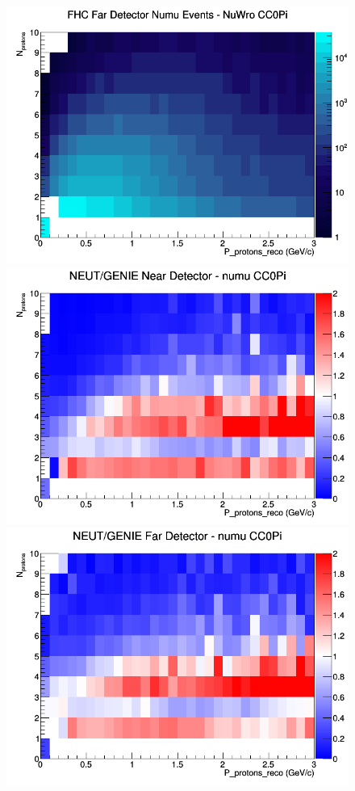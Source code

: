 \begin{figure}[h]
\endminipage
{}
\includegraphics[width=\linewidth]{eff_N_P/GAr/protons/CC0Pi_FHC_FD_numu_N_P_NuWro.png}
\endminipage
\newline
{}
\includegraphics[width=\linewidth]{eff_N_P/GAr/protons/ratios/CC0Pi_NEUT_GENIE_numu_near_N_P.png}
\endminipage
{}
\includegraphics[width=\linewidth]{eff_N_P/GAr/protons/ratios/CC0Pi_NEUT_GENIE_numu_far_N_P.png}

\end{figure}
